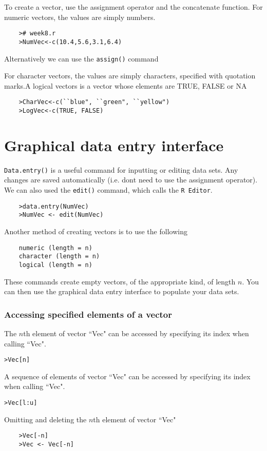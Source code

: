 \documentclass[a4paper,12pt]{article}
\begin{document}
	To create a vector, use the assignment operator and the concatenate function.
	For numeric vectors, the values are simply numbers.
	
	\begin{verbatim}
	># week8.r
	>NumVec<-c(10.4,5.6,3.1,6.4)
	\end{verbatim}
	
	Alternatively we can use the \texttt{assign()} command
	
	For character vectors, the values are simply characters, specified with
	quotation marks.A logical vectors is a vector whose elements are TRUE, FALSE or NA
	
	\begin{verbatim}
	>CharVec<-c(``blue", ``green", ``yellow")
	>LogVec<-c(TRUE, FALSE)
	\end{verbatim}
	
	\section{Graphical data entry interface}
	
	\texttt{Data.entry()} is a useful  command for inputting or editing data sets. Any
	changes are saved automatically (i.e. dont need to use the assignment
	operator). We can also used the \texttt{edit()} command, which calls the \texttt{R Editor}.
	
	\begin{verbatim}
	>data.entry(NumVec)
	>NumVec <- edit(NumVec)
	\end{verbatim}
	
	Another method of creating vectors is to use the following
	\begin{verbatim}
	numeric (length = n)
	character (length = n)
	logical (length = n)
	\end{verbatim}
	These commands create empty vectors, of the appropriate kind, of length $n$. You can then use the graphical data entry interface to populate your data sets.
	
	\subsubsection{Accessing specified elements of a vector}
	
	The $n$th element of vector ``Vec" can be accessed by specifying its index when
	calling ``Vec".
	\begin{verbatim}>Vec[n]
	\end{verbatim}
	A sequence of  elements of vector ``Vec" can be accessed by specifying its index
	when calling ``Vec".
	\begin{verbatim}>Vec[l:u]
	\end{verbatim}
	Omitting and deleting the $n$th element of vector ``Vec"
	\begin{verbatim}
	>Vec[-n]
	>Vec <- Vec[-n]
	\end{verbatim}
	
\end{document}
